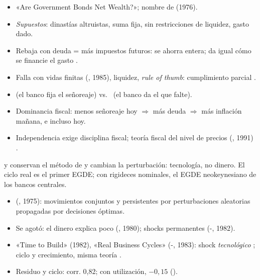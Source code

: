 \documentclass{article}
\begin{document}
\begin{columnas}
\begin{itemize}
\item «Are Government Bonds Net Wealth?»; nombre de  (1976).
\item \emph{Supuestos}: dinastías altruistas, suma fija, sin restricciones de liquidez, gasto dado.
\item Rebaja con deuda = más impuestos futuros: se ahorra entera; da igual cómo se financie el gasto .
\item Falla con vidas finitas (, 1985), liquidez, \emph{rule of thumb}: cumplimiento parcial .
\end{itemize}

\begin{itemize}
\item {} (el banco fija el señoreaje) vs.\  (el banco da el que falte).
\item Dominancia fiscal: menos señoreaje hoy $\Rightarrow$ más deuda $\Rightarrow$ más inflación mañana, e incluso hoy.
\item Independencia exige disciplina fiscal; teoría fiscal del nivel de precios (, 1991) .
\end{itemize}

\begin{ideaclave}
 y  conservan el método de  y cambian la perturbación: tecnología, no dinero. El ciclo real es el primer EGDE; con rigideces nominales, el EGDE neokeynesiano de los bancos centrales.
\end{ideaclave}

\begin{itemize}
\item {} (, 1975): movimientos conjuntos y persistentes por perturbaciones aleatorias propagadas por decisiones óptimas.
\item Se agotó: el dinero explica poco (, 1980); shocks permanentes (-, 1982).
\item «Time to Build» (1982), «Real Business Cycles» (-, 1983): shock \emph{tecnológico} ; ciclo y crecimiento, misma teoría .
\item Residuo y ciclo: corr. 0,82; con utilización, $-0{,}15$ ().
\end{itemize}


\end{columnas}
\end{document}
